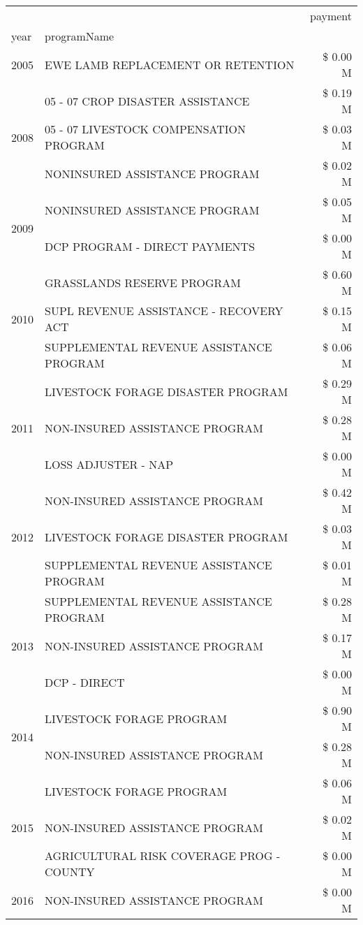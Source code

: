 \begin{tabular}{llr}
\toprule
 &  & payment \\
year & programName &  \\
\midrule
2005 & EWE LAMB REPLACEMENT OR RETENTION & \$ 0.00 M \\
\cline{1-3}
\multirow[t]{3}{*}{2008} & 05 - 07 CROP DISASTER ASSISTANCE & \$ 0.19 M \\
 & 05 - 07 LIVESTOCK COMPENSATION PROGRAM & \$ 0.03 M \\
 & NONINSURED ASSISTANCE PROGRAM & \$ 0.02 M \\
\cline{1-3}
\multirow[t]{2}{*}{2009} & NONINSURED ASSISTANCE PROGRAM & \$ 0.05 M \\
 & DCP PROGRAM - DIRECT PAYMENTS & \$ 0.00 M \\
\cline{1-3}
\multirow[t]{3}{*}{2010} & GRASSLANDS RESERVE PROGRAM & \$ 0.60 M \\
 & SUPL REVENUE ASSISTANCE - RECOVERY ACT & \$ 0.15 M \\
 & SUPPLEMENTAL REVENUE ASSISTANCE PROGRAM & \$ 0.06 M \\
\cline{1-3}
\multirow[t]{3}{*}{2011} & LIVESTOCK FORAGE DISASTER PROGRAM & \$ 0.29 M \\
 & NON-INSURED ASSISTANCE PROGRAM & \$ 0.28 M \\
 & LOSS ADJUSTER - NAP & \$ 0.00 M \\
\cline{1-3}
\multirow[t]{3}{*}{2012} & NON-INSURED ASSISTANCE PROGRAM & \$ 0.42 M \\
 & LIVESTOCK FORAGE DISASTER PROGRAM & \$ 0.03 M \\
 & SUPPLEMENTAL REVENUE ASSISTANCE PROGRAM & \$ 0.01 M \\
\cline{1-3}
\multirow[t]{3}{*}{2013} & SUPPLEMENTAL REVENUE ASSISTANCE PROGRAM & \$ 0.28 M \\
 & NON-INSURED ASSISTANCE PROGRAM & \$ 0.17 M \\
 & DCP - DIRECT & \$ 0.00 M \\
\cline{1-3}
\multirow[t]{2}{*}{2014} & LIVESTOCK FORAGE PROGRAM & \$ 0.90 M \\
 & NON-INSURED ASSISTANCE PROGRAM & \$ 0.28 M \\
\cline{1-3}
\multirow[t]{3}{*}{2015} & LIVESTOCK FORAGE PROGRAM & \$ 0.06 M \\
 & NON-INSURED ASSISTANCE PROGRAM & \$ 0.02 M \\
 & AGRICULTURAL RISK COVERAGE PROG - COUNTY & \$ 0.00 M \\
\cline{1-3}
\multirow[t]{2}{*}{2016} & NON-INSURED ASSISTANCE PROGRAM & \$ 0.00 M \\

\end{tabular}
